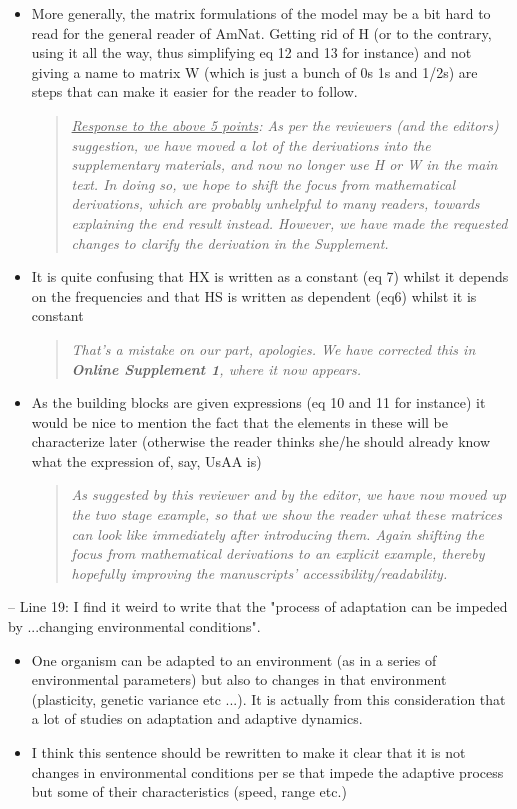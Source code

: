 \documentclass[11pt]{article}
\begin{document}
\begin{itemize}
	\item More generally, the matrix formulations of the model may be a bit hard to read for the general reader of AmNat. Getting rid of H (or to the contrary, using it all the way, thus simplifying eq 12 and 13 for instance) and not giving a name to matrix W (which is just a bunch of 0s 1s and 1/2s) are steps that can make it easier for the reader to follow.
\begin{quote}
	{\itshape \ul{Response to the above 5 points}: As per the reviewers (and the editors) suggestion, we have moved a lot of the derivations into the supplementary materials, and now no longer use H or W in the main text. In doing so, we hope to shift the focus from mathematical derivations, which are probably unhelpful to many readers, towards explaining the end result instead. However, we have made the requested changes to clarify the derivation in the Supplement. }
\end{quote}

	\item It is quite confusing that HX is written as a constant (eq 7) whilst it depends on the frequencies and that HS is written as dependent (eq6) whilst it is constant
	\begin{quote}
	{\itshape That's a mistake on our part, apologies. We have corrected this in {\bf Online Supplement 1}, where it now appears.}
\end{quote}
	\item As the building blocks are given expressions (eq 10 and 11 for instance) it would be nice to mention the fact that the elements in these will be characterize later (otherwise the reader thinks she/he should already know what the expression of, say, UsAA is)
\begin{quote}
	{\itshape As suggested by this reviewer and by the editor, we have now moved up the two stage example, so that we show the reader what these matrices can look like immediately after introducing them. Again shifting the focus from mathematical derivations to an explicit example, thereby hopefully improving the manuscripts' accessibility/readability.  }
\end{quote}

\end{itemize}

\noindent -- Line 19: I find it weird to write that the "process of adaptation can be impeded by ...changing environmental conditions".

\begin{itemize}
	\item One organism can be adapted to an environment (as in a series of environmental parameters) but also to changes in that environment (plasticity, genetic variance etc ...). It is actually from this consideration that a lot of studies on adaptation and adaptive dynamics.
	\item I think this sentence should be rewritten to make it clear that it is not changes in environmental conditions per se that impede the adaptive process but some of their characteristics (speed, range etc.)
\end{itemize}
\end{document}
